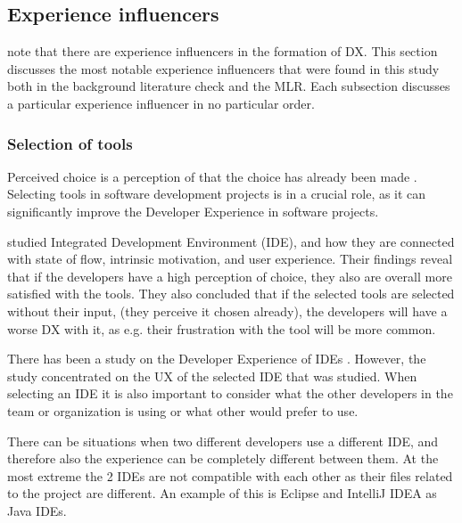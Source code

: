 \documentclass[english, 12pt, a4paper, sci, utf8, a-1b, online]{aaltothesis}
\begin{document}
\subsection{Experience influencers}

\textcite{fagerholm-doctoral-thesis} note that there are experience influencers in the formation of DX. This section discusses the most notable experience influencers that were found in this study both in the background literature check and the MLR. Each subsection discusses a particular experience influencer in no particular order.

\subsubsection{Selection of tools}

Perceived choice is a perception of that the choice has already been made \parencite{flow-intrinsic-dx}. Selecting tools in software development projects is in a crucial role, as it can significantly improve the Developer Experience in software projects.

\textcite{flow-intrinsic-dx} studied Integrated Development Environment (IDE), and how they are connected with state of flow, intrinsic motivation, and user experience. Their findings reveal that if the developers have a high perception of choice, they also are overall more satisfied with the tools. They also concluded that if the selected tools are selected without their input, (they perceive it chosen already), the developers will have a worse DX with it, as e.g. their frustration with the tool will be more common.

There has been a study on the Developer Experience of IDEs \parencite{software-developers-as-users}. However, the study concentrated on the UX of the selected IDE that was studied. When selecting an IDE it is also important to consider what the other developers in the team or organization is using or what other would prefer to use.

There can be situations when two different developers use a different IDE, and therefore also the experience can be completely different between them. At the most extreme the 2 IDEs are not compatible with each other as their files related to the project are different. An example of this is Eclipse and IntelliJ IDEA as Java IDEs.
\end{document}
